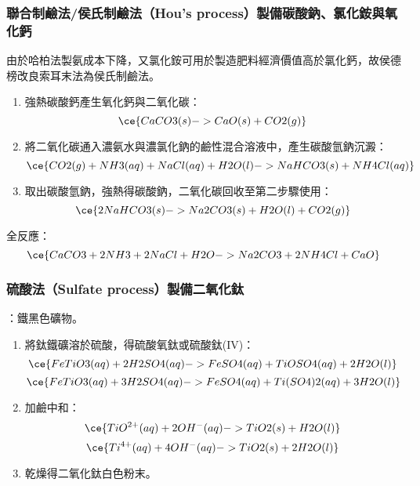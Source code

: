 \documentclass[a4paper,12pt]{report}
\begin{document}
\begin{itemize}
\begin{itemize}
\subsubsection{聯合制鹼法/侯氏制鹼法（Hou's process）製備碳酸鈉、氯化銨與氧化鈣}
由於哈柏法製氨成本下降，又氯化銨可用於製造肥料經濟價值高於氯化鈣，故侯德榜改良索耳末法為侯氏制鹼法。
\begin{enumerate}
\item 強熱碳酸鈣產生氧化鈣與二氧化碳：
\[\ce{CaCO3(s) -> CaO(s) + CO2(g)}\]
\item 將二氧化碳通入濃氨水與濃氯化鈉的鹼性混合溶液中，產生碳酸氫鈉沉澱：
\[\ce{CO2(g) + NH3(aq) + NaCl(aq) + H2O(l) -> NaHCO3(s) + NH4Cl(aq)}\]
\item 取出碳酸氫鈉，強熱得碳酸鈉，二氧化碳回收至第二步驟使用：
\[\ce{2NaHCO3(s) -> Na2CO3(s) + H2O(l) + CO2(g)}\]
\end{enumerate}
全反應：
\[\ce{CaCO3 + 2NH3 + 2NaCl + H2O -> Na2CO3 + 2NH4Cl + CaO}\]
\subsubsection{硫酸法（Sulfate process）製備二氧化鈦}
：鐵黑色礦物。
\begin{enumerate}
\item 將鈦鐵礦溶於硫酸，得硫酸氧鈦或硫酸鈦(IV)：
\[\ce{FeTiO3(aq) + 2H2SO4(aq) -> FeSO4(aq) + TiOSO4(aq) + 2H2O(l)}\]
\[\ce{FeTiO3(aq) + 3H2SO4(aq) -> FeSO4(aq) + Ti(SO4)2(aq) + 3H2O(l)}\]
\item 加鹼中和：
\[\ce{TiO^{2+}(aq) + 2OH^-(aq) -> TiO2(s) + H2O(l)}\]
\[\ce{Ti^{4+}(aq) + 4OH^-(aq) -> TiO2(s) + 2H2O(l)}\]
\item 乾燥得二氧化鈦白色粉末。
\end{enumerate}

\end{itemize}
\end{itemize}
\end{document}
